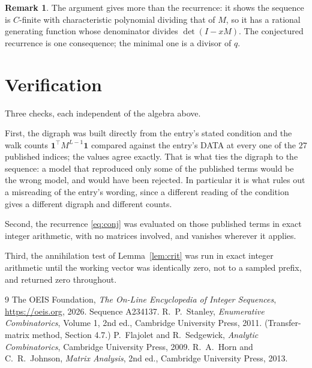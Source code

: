 \documentclass[11pt,a4paper]{article}
\theoremstyle{plain}
\theoremstyle{definition}
\newtheorem{remark}[theorem]{Remark}
\begin{document}
\begin{remark}
The argument gives more than the recurrence: it shows the sequence is $C$-finite with
characteristic polynomial dividing that of $M$, so it has a rational generating function
whose denominator divides $\det(I-xM)$. The conjectured recurrence is one consequence; the
minimal one is a divisor of $q$.
\end{remark}

\section{Verification}

Three checks, each independent of the algebra above.

First, the digraph was built directly from the entry's stated condition and the walk counts
$\mathbf{1}^{\!\top}M^{L-1}\mathbf{1}$ compared against the entry's DATA at
every one of the $27$ published indices; the values agree exactly. That is what ties
the digraph to the sequence: a model that reproduced only some of the published terms would
be the wrong model, and would have been rejected. In particular it is what rules out a
misreading of the entry's wording, since a different reading of the condition gives a
different digraph and different counts.

Second, the recurrence \eqref{eq:conj} was evaluated on those published terms in exact
integer arithmetic, with no matrices involved, and vanishes wherever it applies.

Third, the annihilation test of Lemma~\ref{lem:crit} was run in exact integer arithmetic
until the working vector was identically zero, not to a sampled prefix, and returned zero
throughout.

\begin{thebibliography}{9}
 The OEIS Foundation, \emph{The On-Line Encyclopedia of Integer
Sequences}, \url{https://oeis.org}, 2026. Sequence A234137.
 R.~P.~Stanley, \emph{Enumerative Combinatorics}, Volume 1, 2nd ed.,
Cambridge University Press, 2011. (Transfer-matrix method, Section 4.7.)
 P.~Flajolet and R.~Sedgewick, \emph{Analytic Combinatorics}, Cambridge
University Press, 2009.
 R.~A.~Horn and C.~R.~Johnson, \emph{Matrix Analysis}, 2nd ed., Cambridge
University Press, 2013.
\end{thebibliography}
\end{document}

